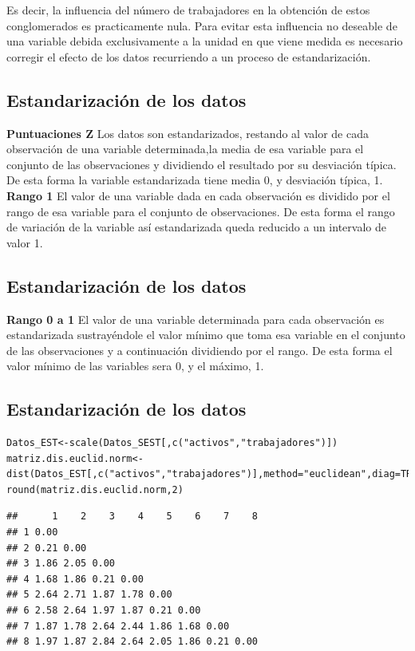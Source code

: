 \documentclass[]{article}
\begin{document}
\hypertarget{right}{}
Es decir, la influencia del número de trabajadores en la obtención de
estos conglomerados es practicamente nula. Para evitar esta influencia
no deseable de una variable debida exclusivamente a la unidad en que
viene medida es necesario corregir el efecto de los datos recurriendo a
un proceso de estandarización.

\subsection{Estandarización de los
datos}\label{estandarizaciuxf3n-de-los-datos-3}

 \textbf{Puntuaciones Z} Los datos son estandarizados, restando al valor
de cada observación de una variable determinada,la media de esa variable
para el conjunto de las observaciones y dividiendo el resultado por su
desviación típica. De esta forma la variable estandarizada tiene media
0, y desviación típica, 1. \textbf{Rango 1} El valor de una variable
dada en cada observación es dividido por el rango de esa variable para
el conjunto de observaciones. De esta forma el rango de variación de la
variable así estandarizada queda reducido a un intervalo de valor 1.

\subsection{Estandarización de los
datos}\label{estandarizaciuxf3n-de-los-datos-4}

\textbf{Rango 0 a 1} El valor de una variable determinada para cada
observación es estandarizada sustrayéndole el valor mínimo que toma esa
variable en el conjunto de las observaciones y a continuación dividiendo
por el rango. De esta forma el valor mínimo de las variables sera 0, y
el máximo, 1.

\subsection{Estandarización de los
datos}\label{estandarizaciuxf3n-de-los-datos-5}

\hypertarget{left}{}
\begin{verbatim}
Datos_EST<-scale(Datos_SEST[,c("activos","trabajadores")])
matriz.dis.euclid.norm<-dist(Datos_EST[,c("activos","trabajadores")],method="euclidean",diag=TRUE)
round(matriz.dis.euclid.norm,2)
\end{verbatim}

\begin{verbatim}
##      1    2    3    4    5    6    7    8
## 1 0.00                                   
## 2 0.21 0.00                              
## 3 1.86 2.05 0.00                         
## 4 1.68 1.86 0.21 0.00                    
## 5 2.64 2.71 1.87 1.78 0.00               
## 6 2.58 2.64 1.97 1.87 0.21 0.00          
## 7 1.87 1.78 2.64 2.44 1.86 1.68 0.00     
## 8 1.97 1.87 2.84 2.64 2.05 1.86 0.21 0.00
\end{verbatim}
\end{document}
